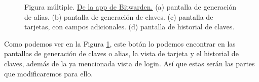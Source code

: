 \begin{figure}[H]
    \caption{
        Figura múltiple. \href{https://play.google.com/store/apps/details?id=com.x8bit.bitwarden}{De la app de Bitwarden.} \newline
        \tab (a) pantalla de generación de alias. \newline
        \tab (b) pantalla de generación de claves. \newline
        \tab (c) pantalla de tarjetas, con campos adicionales. \newline
        \tab (d) pantalla de historial de claves.
        }
    \label{fig:bitapp-copy}
\end{figure}

Como podemos ver en la Figura \ref{fig:bitapp-copy}, este botón lo podemos encontrar en las pantallas de generación de claves o alias, la vista de tarjeta y el historial de claves, además de la ya mencionada vista de \gls{login}. Así que estas serán las partes que modificaremos para ello.

